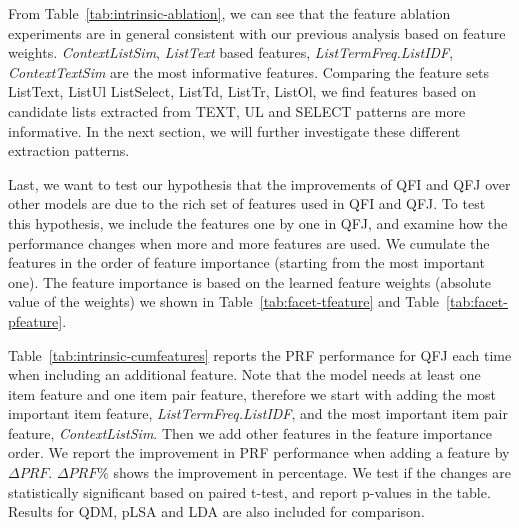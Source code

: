From Table~\ref{tab:intrinsic-ablation}, we can see that the feature ablation experiments are in general consistent with our previous analysis based on feature weights. \textit{ContextListSim}, \textit{ListText} based features, \textit{ListTermFreq.ListIDF}, \textit{ContextTextSim} are the most informative features. Comparing the feature sets ListText, ListUl ListSelect, ListTd, ListTr, ListOl, we find features based on candidate lists extracted from TEXT, UL and SELECT patterns are more informative. In the next section, we will further investigate these different extraction patterns.


Last, we want to test our hypothesis that the improvements of QFI and QFJ over other models are due to the rich set of features used in QFI and QFJ. To test this hypothesis, we include the features one by one in QFJ, and examine how the performance changes when more and more features are used. We cumulate the features in the order of feature importance (starting from the most important one). The feature importance is based on the learned feature weights (absolute value of the weights) we shown in Table~\ref{tab:facet-tfeature} and Table~\ref{tab:facet-pfeature}. 


Table~\ref{tab:intrinsic-cumfeatures} reports the PRF performance for QFJ each time when including an additional feature. Note that the model needs at least one item feature and one item pair feature, therefore we start with adding the most important item feature, \textit{ListTermFreq.ListIDF}, and the most important item pair feature, \textit{ContextListSim}. Then we add other features in the feature importance order. We report the improvement in PRF performance when adding a feature by $\Delta{PRF}$. $\Delta{PRF}\%$ shows the improvement in percentage. We test if the changes are statistically significant based on paired t-test, and report p-values in the table. Results for QDM, pLSA and LDA are also included for comparison.

